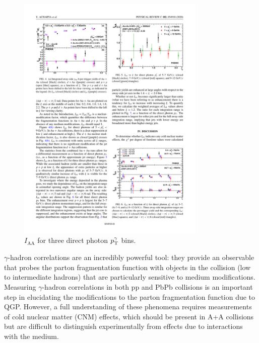 \begin{figure}[htpb]
  \centering
  \includegraphics[width=0.8\textwidth]{Introduction/phenix_gh_IAA.pdf}
  \caption{$I_\mathrm{AA}$ for three direct photon $p_{\mathrm{T}}^\gamma$ bins.}
  \label{fig:phenix_gh_IAA}
\end{figure}


$\gamma$-hadron correlations are an incredibly powerful tool: they provide an observable that probes the parton fragmentation function with objects in the collision (low to intermediate \pt hadrons) that are particularly sensitive to medium modifications. Measuring $\gamma$-hadron correlations in both pp and PbPb collisions is an important step in elucidating the modifications to the parton fragmentation function due to QGP. However, a full understanding of these phenomena requires measurements of cold nuclear matter (CNM) effects, which should be present in A+A collisions but are difficult to distinguish experimentally from effects due to interactions with the medium.


